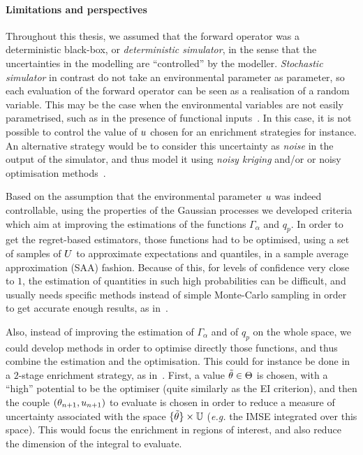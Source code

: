 \documentclass[../../Main_ManuscritThese.tex]{subfiles}
\begin{document}
\paragraph{Limitations and perspectives}
Throughout this thesis, we assumed that the forward operator was a
deterministic black-box, or \emph{deterministic simulator}, in the
sense that the uncertainties in the modelling are ``controlled'' by
the modeller. \emph{Stochastic simulator} in contrast do not take an
environmental parameter as parameter, so each evaluation of the
forward operator can be seen as a realisation of a random
variable. This may be the case when the environmental variables are
not easily parametrised, such as in the presence of functional
inputs~\cite{el_amri_analyse_2019}. In this case, it is not possible
to control the value of $u$ chosen for an enrichment strategies for
instance. An alternative strategy would be to consider this
uncertainty as \emph{noise} in the output of the simulator, and thus
model it using \emph{noisy kriging} and/or or noisy optimisation
methods~\cite{picheny_noisy_2014}.

Based on the assumption that the environmental parameter $u$ was
indeed controllable, using the properties of the Gaussian processes we
developed criteria which aim at improving the estimations of the
functions $\Gamma_\alpha$ and $q_p$. In order to get the regret-based
estimators, those functions had to be optimised, using a set of
samples of $U$ to approximate expectations and quantiles, in a
sample average approximation (SAA) fashion. Because of this, for
levels of confidence very close to $1$, the estimation of quantities
in such high probabilities can be difficult, and usually needs
specific methods instead of simple Monte-Carlo sampling in order to
get accurate enough results, as in~\cite{razaaly_rare_2019}.

Also, instead of improving the estimation of $\Gamma_{\alpha}$ and of
$q_p$ on the whole space, we could develop methods in order to
optimise directly those functions, and thus combine the estimation and
the optimisation.  This could for instance be done in a $2$-stage
enrichment strategy, as
in~\cite{janusevskis_simultaneous_2010}. First, a value
$\tilde{\theta} \in \Theta$ is chosen, with a ``high'' potential to be
the optimiser (quite similarly as the EI criterion), and then the
couple $(\theta_{n+1}, u_{n+1})$ to evaluate is chosen in order to
reduce a measure of uncertainty associated with the space
$\{\tilde{\theta}\} \times \mathbb{U}$ (\emph{e.g.} the IMSE integrated over
this space). This would focus the enrichment in regions of interest,
and also reduce the dimension of the integral to evaluate.
\end{document}
